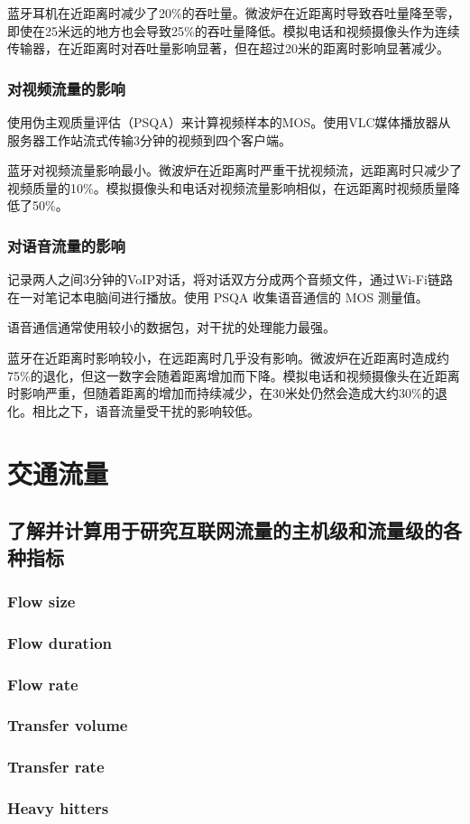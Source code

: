 蓝牙耳机在近距离时减少了20\%的吞吐量。微波炉在近距离时导致吞吐量降至零，即使在25米远的地方也会导致25\%的吞吐量降低。模拟电话和视频摄像头作为连续传输器，在近距离时对吞吐量影响显著，但在超过20米的距离时影响显著减少。

\subsection{对视频流量的影响}

使用伪主观质量评估（PSQA）来计算视频样本的MOS。使用VLC媒体播放器从服务器工作站流式传输3分钟的视频到四个客户端。

蓝牙对视频流量影响最小。微波炉在近距离时严重干扰视频流，远距离时只减少了视频质量的10\%。模拟摄像头和电话对视频流量影响相似，在远距离时视频质量降低了50\%。

\subsection{对语音流量的影响}

记录两人之间3分钟的VoIP对话，将对话双方分成两个音频文件，通过Wi-Fi链路在一对笔记本电脑间进行播放。使用 PSQA 收集语音通信的 MOS 测量值。

语音通信通常使用较小的数据包，对干扰的处理能力最强。

蓝牙在近距离时影响较小，在远距离时几乎没有影响。微波炉在近距离时造成约75\%的退化，但这一数字会随着距离增加而下降。模拟电话和视频摄像头在近距离时影响严重，但随着距离的增加而持续减少，在30米处仍然会造成大约30\%的退化。相比之下，语音流量受干扰的影响较低。


\chapter{交通流量}

\section{了解并计算用于研究互联网流量的主机级和流量级的各种指标}

\subsection{Flow size}
\subsection{Flow duration}
\subsection{Flow rate}
\subsection{Transfer volume}
\subsection{Transfer rate}
\subsection{Heavy hitters}

